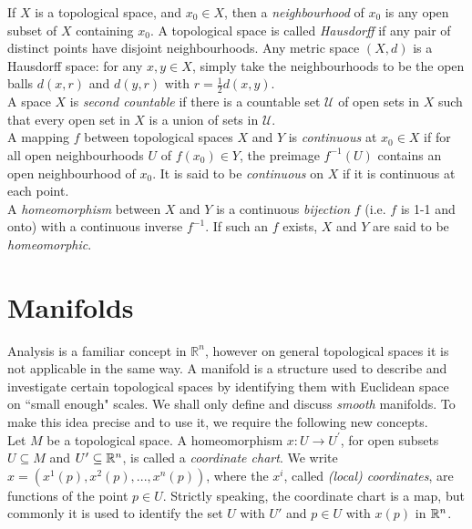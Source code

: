 If $X$ is a topological space, and $x_0 \in X$, then a \textit{neighbourhood} of
$x_0$ is any open subset of $X$ containing $x_0$. A topological space is called
\textit{Hausdorff} if any pair of distinct points have disjoint neighbourhoods.
Any metric space $(X,d)$ is a Hausdorff space: for any $x,y \in X$, simply take
the neighbourhoods to be the open balls $d(x,r)$ and $d(y,r)$ with
$r=\frac{1}{2}d(x,y)$. \\

A space $X$ is \textit{second countable} if there is a countable set
$\mathcal{U}$ of open sets in $X$ such that every open set in $X$ is a union of
sets in $\mathcal{U}$.\\

A mapping $f$ between topological spaces $X$ and $Y$ is \textit{continuous} at
$x_0 \in X$ if for all open neighbourhoods $U$ of $f(x_0)\in Y$, the preimage
$f^{-1}(U)$ contains an open neighbourhood of $x_0$. It is said to be
\textit{continuous} on $X$ if it is continuous at each point.\\

A \textit{homeomorphism} between $X$ and $Y$ is a continuous \textit{bijection}
$f$ (i.e. $f$ is 1-1 and onto) with a continuous inverse $f^{-1}$. If such an
$f$ exists, $X$ and $Y$ are said to be \textit{homeomorphic}.\\ 

\pagebreak
\section{Manifolds}\label{sec:Manifolds}
Analysis is a familiar concept in $\mathbb{R}^n$, however on general topological
spaces it is not applicable in the same way. A manifold is a structure used to
describe and investigate certain topological spaces by identifying them with
Euclidean space on ``small enough" scales. We shall only define and discuss {\em
smooth} manifolds. To make this idea precise and to use it, we require the
following new concepts.\\

Let $M$ be a topological space. A homeomorphism $x:U\rightarrow U^\prime$, for
open subsets $U\subseteq M$ and $U^\prime\subseteq {\mathbb R}^n$, is called a
\textit{coordinate chart}. We write $x=\left(x^1(p),x^2(p),...,x^n(p)\right)$,
where the $x^i$, called \textit{(local) coordinates}, are functions of the point
$p\in U$. Strictly speaking, the coordinate chart is a map, but commonly it
is used to identify the set $U$ with $U'$ and $p\in U$ with $x(p)$ in ${\mathbb R}^n$.\\

